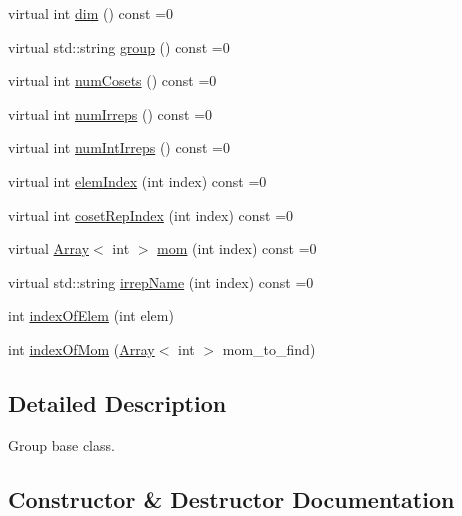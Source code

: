 \begin{DoxyCompactItemize}
virtual int \mbox{\hyperlink{structHadron_1_1LatticeGroup_abd8415698323796ef6a8605796ee3bea}{dim}} () const =0
\item 
virtual std\+::string \mbox{\hyperlink{structHadron_1_1LatticeGroup_a82208a322bf1b1db489f16af38e70087}{group}} () const =0
\item 
virtual int \mbox{\hyperlink{structHadron_1_1LatticeGroup_afc76430f36a3a041f86d4058c59bf55e}{num\+Cosets}} () const =0
\item 
virtual int \mbox{\hyperlink{structHadron_1_1LatticeGroup_a3edaca488144b5d2a9cf73fe653add34}{num\+Irreps}} () const =0
\item 
virtual int \mbox{\hyperlink{structHadron_1_1LatticeGroup_af2aa7b39222bf188389356eefcef7547}{num\+Int\+Irreps}} () const =0
\item 
virtual int \mbox{\hyperlink{structHadron_1_1LatticeGroup_afb8e3ee60de059f75bce1044c694e1e8}{elem\+Index}} (int index) const =0
\item 
virtual int \mbox{\hyperlink{structHadron_1_1LatticeGroup_a7e3b9b5e2f596e6c40d64aa939a3ad6c}{coset\+Rep\+Index}} (int index) const =0
\item 
virtual \mbox{\hyperlink{classXMLArray_1_1Array}{Array}}$<$ int $>$ \mbox{\hyperlink{structHadron_1_1LatticeGroup_ad577b65041dd9a6e84b1f3bd49cb8fce}{mom}} (int index) const =0
\item 
virtual std\+::string \mbox{\hyperlink{structHadron_1_1LatticeGroup_a4bc5620218c2a73157e19bc4451fe746}{irrep\+Name}} (int index) const =0
\item 
int \mbox{\hyperlink{structHadron_1_1LatticeGroup_a4a664d3cbcc8a3b1634e4eb8434f1199}{index\+Of\+Elem}} (int elem)
\item 
int \mbox{\hyperlink{structHadron_1_1LatticeGroup_a49927e4a4d386b2e3eed6f3b5c1ee76d}{index\+Of\+Mom}} (\mbox{\hyperlink{classXMLArray_1_1Array}{Array}}$<$ int $>$ mom\+\_\+to\+\_\+find)
\end{DoxyCompactItemize}


\subsection{Detailed Description}
Group base class. 

\subsection{Constructor \& Destructor Documentation}
\mbox{\label{structHadron_1_1LatticeGroup_a8265941ad6e64b658d2eb904e7d85d62}} 
